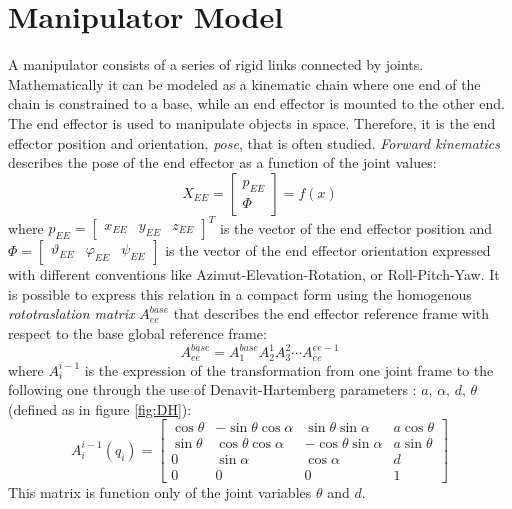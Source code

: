 \section{Manipulator Model}
A manipulator consists of a series of rigid links connected by joints. Mathematically it can be modeled as a kinematic chain where one end of the chain is constrained to a base, while an end effector is mounted to the other end. The end effector is used to manipulate objects in space. Therefore, it is the end effector position and orientation, \textit{pose}, that is often studied. \textit{Forward kinematics} describes the pose of the end effector as a function of the joint values:
\begin{equation}
 	X_{EE}=\left[\begin{matrix}p_{EE}\\\Phi\end{matrix}\right]=f(x)
\end{equation} 
where $p_{EE}=\left[\begin{matrix}x_{EE}&y_{EE}&z_{EE}\end{matrix}\right]^T$ is the vector of the end effector position and $\Phi =\left[\begin{matrix}\vartheta_{EE}&\varphi_{EE}&\psi_{EE}\end{matrix}\right]$ is the vector of the end effector orientation expressed with different conventions like Azimut-Elevation-Rotation, or Roll-Pitch-Yaw. 
It is possible to express this relation in a compact form using the homogenous \textit{rototraslation matrix} $A_{ee}^{base}$ that describes the end effector reference frame with respect to the base global reference frame:
\begin{equation}\label{AAAA}
A_{ee}^{base}=A_1^{base}A_2^1A_3^2\cdots A_{ee}^{ee-1}
\end{equation}
where $A_i^{i-1}$ is the expression of the transformation from one joint frame to the following one through the use of Denavit-Hartemberg parameters \cite{DH}: $a\text{, }\alpha\text{, }d\text{, }\theta$ (defined as in figure \ref{fig:DH}):
\begin{equation}
A_i^{i-1}(q_i)=\left[
\begin{matrix}
\cos\theta & -\sin\theta\cos\alpha & \sin\theta\sin\alpha & a\cos\theta \\
\sin\theta & \cos\theta\cos\alpha & -\cos\theta\sin\alpha & a\sin\theta \\
0 & \sin\alpha & \cos\alpha & d \\
0 & 0 & 0 & 1
\end{matrix}
\right]
\end{equation}
This matrix is function only of the joint variables $\theta$ and $d$.

